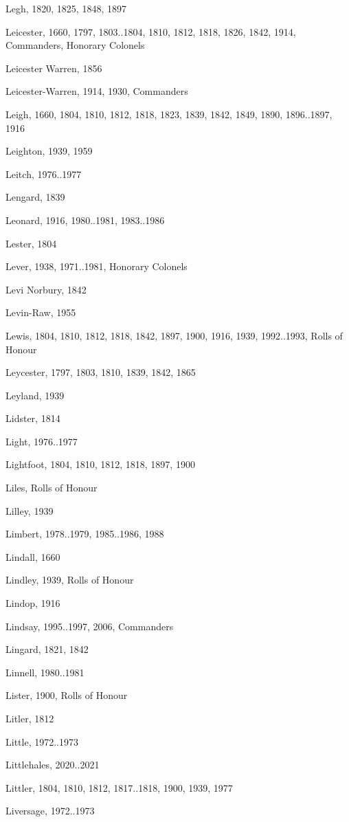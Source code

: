 \begin{theindex}
\item Legh, 1820, 1825, 1848, 1897
\item Leicester, 1660, 1797, 1803..1804, 1810, 1812, 1818, 1826, 1842, 1914, Commanders, Honorary Colonels
\item Leicester Warren, 1856
\item Leicester-Warren, 1914, 1930, Commanders
\item Leigh, 1660, 1804, 1810, 1812, 1818, 1823, 1839, 1842, 1849, 1890, 1896..1897, 1916
\item Leighton, 1939, 1959
\item Leitch, 1976..1977
\item Lengard, 1839
\item Leonard, 1916, 1980..1981, 1983..1986
\item Lester, 1804
\item Lever, 1938, 1971..1981, Honorary Colonels
\item Levi Norbury, 1842
\item Levin-Raw, 1955
\item Lewis, 1804, 1810, 1812, 1818, 1842, 1897, 1900, 1916, 1939, 1992..1993, Rolls of Honour
\item Leycester, 1797, 1803, 1810, 1839, 1842, 1865
\item Leyland, 1939
\item Lidster, 1814
\item Light, 1976..1977
\item Lightfoot, 1804, 1810, 1812, 1818, 1897, 1900
\item Liles, Rolls of Honour
\item Lilley, 1939
\item Limbert, 1978..1979, 1985..1986, 1988
\item Lindall, 1660
\item Lindley, 1939, Rolls of Honour
\item Lindop, 1916
\item Lindsay, 1995..1997, 2006, Commanders
\item Lingard, 1821, 1842
\item Linnell, 1980..1981
\item Lister, 1900, Rolls of Honour
\item Litler, 1812
\item Little, 1972..1973
\item Littlehales, 2020..2021
\item Littler, 1804, 1810, 1812, 1817..1818, 1900, 1939, 1977
\item Liversage, 1972..1973

\end{theindex}
